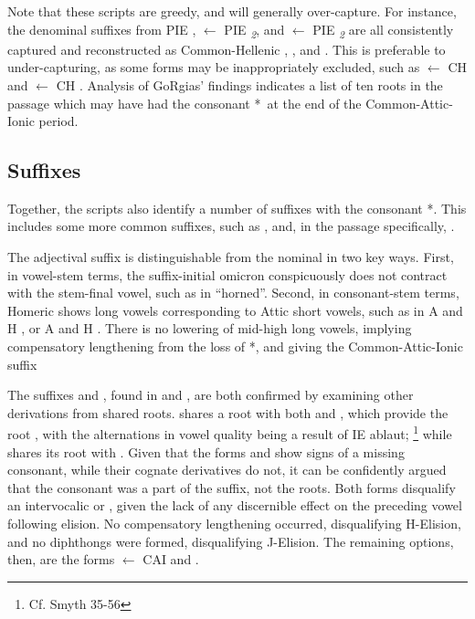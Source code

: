 Note that these scripts are greedy, and will generally over-capture. For instance, the denominal suffixes  from PIE ,  $\gets$ PIE \textit{\textsubscript{2}}, and  $\gets$ PIE \textit{\textsubscript{2}} are all consistently captured and reconstructed as Common-Hellenic , , and . This is preferable to under-capturing, as some forms may be inappropriately excluded, such as  $\gets$ CH  and  $\gets$ CH  . Analysis of GoRgias' findings indicates a list of ten roots in the passage which may have had the consonant *\w\ at the end of the Common-Attic-Ionic period.


\subsection{Suffixes}
Together, the scripts also identify a number of suffixes with the consonant *\w.
This includes some more common suffixes, such as , and,
in the passage specifically, .

The adjectival suffix  is distinguishable from the nominal  in two key ways. First, in vowel-stem terms, the suffix-initial omicron  conspicuously does not contract with the stem-final vowel, such as in  ``horned''. Second, in consonant-stem terms, Homeric shows long vowels corresponding to Attic short vowels, such as in A  and H , or A  and H . There is no lowering of mid-high long vowels, implying compensatory lengthening from the loss of *\w, and giving the Common-Attic-Ionic suffix 

The suffixes  and , found in  and ,
are both confirmed by examining other derivations from shared roots. 
shares a root with both  and , which provide
the root , with the alternations in vowel quality being a result
of IE ablaut; \footnote{Cf. Smyth 35-56} while  shares its root with
. Given that the forms  and  show signs
of a missing consonant, while their cognate derivatives do not, it can be
confidently argued that the consonant was a part of the suffix, not the roots.
Both forms disqualify an intervocalic  or , given the lack of any
discernible effect on the preceding vowel following elision.
No compensatory lengthening occurred, disqualifying H-Elision, and no
diphthongs were formed, disqualifying J-Elision. The remaining options, then,
are the forms  $\gets$ CAI  and
. 

